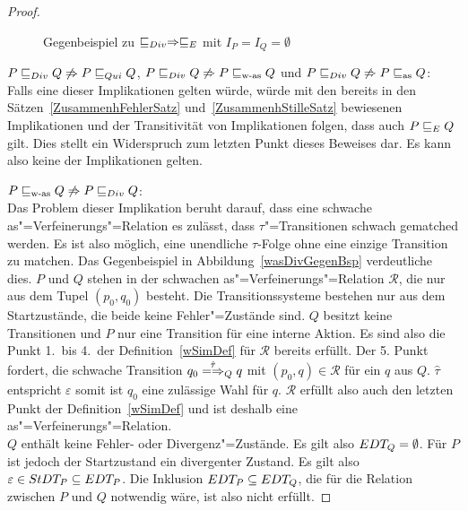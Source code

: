 \begin{proof}
  \begin{figure}[htbp]
    \begin{center}
      \caption{Gegenbeispiel zu $ \sqsubseteq  _{Div} \Rightarrow  \sqsubseteq  _E$ mit $I_P = I_Q =
      \emptyset$}
      \label{DivEGegenBsp}
    \end{center}
  \end{figure}

  $P  \sqsubseteq  _{Div} Q \not\Rightarrow P  \sqsubseteq  _{Qui} Q$, $P  \sqsubseteq  _{Div} Q \not\Rightarrow P \sqsubseteq _{\mathrm{w}\text{-}\mathrm{as}}
  Q$ und $P  \sqsubseteq  _{Div} Q \not\Rightarrow P \sqsubseteq _{\mathrm{as}} Q$:\\
  Falls eine dieser Implikationen gelten würde, würde mit den bereits in den
  Sätzen~\ref{ZusammenhFehlerSatz} und~\ref{ZusammenhStilleSatz} bewiesenen
  Implikationen und der Transitivität von Implikationen folgen, dass auch $P
   \sqsubseteq  _E Q$ gilt. Dies stellt ein Widerspruch zum letzten Punkt dieses Beweises
  dar. Es kann also keine der Implikationen gelten.

  $P \sqsubseteq _{\mathrm{w}\text{-}\mathrm{as}} Q \not\Rightarrow P  \sqsubseteq  _{Div} Q$:\\
  Das Problem dieser Implikation beruht darauf, dass eine schwache
  as"=Verfeinerungs"=Relation es zulässt, dass $\tau$"=Transitionen schwach
  gematched werden. Es ist also möglich, eine unendliche $\tau$-Folge ohne eine
  einzige Transition zu matchen. Das Gegenbeispiel in
  Abbildung~\ref{wasDivGegenBsp} verdeutliche dies. $P$ und $Q$ stehen in der
  schwachen as"=Verfeinerungs"=Relation $\mathcal{R}$, die nur aus dem Tupel
  $(p_0,q_0)$ besteht. Die Transitionssysteme bestehen nur aus dem
  Startzustände, die beide keine Fehler"=Zustände sind. $Q$ besitzt keine
  Transitionen und $P$ nur eine Transition für eine interne Aktion. Es sind
  also die Punkt 1.\ bis 4.\ der Definition~\ref{wSimDef} für $\mathcal{R}$
  bereits erfüllt. Der 5. Punkt fordert, die schwache Transition $q_0
  \weakmay[\hat{\tau}]_Q q$ mit $(p_0,q) \in \mathcal{R}$ für ein $q$ aus $Q$.
  $\hat{\tau}$ entspricht $\varepsilon$ somit ist $q_0$ eine zulässige Wahl für
  $q$. $\mathcal{R}$ erfüllt also auch den letzten Punkt der
  Definition~\ref{wSimDef} und ist deshalb eine as"=Verfeinerungs"=Relation.\\
  $Q$ enthält keine Fehler- oder Divergenz"=Zustände. Es gilt also $EDT _Q=
  \emptyset$. Für $P$ ist jedoch der Startzustand ein divergenter Zustand. Es
  gilt also $\varepsilon \in StDT _P\subseteq EDT _P$. Die Inklusion $EDT _P
  \subseteq EDT _Q$, die für die Relation \DRel{} zwischen $P$ und $Q$
  notwendig wäre, ist also nicht erfüllt.


\end{proof}
